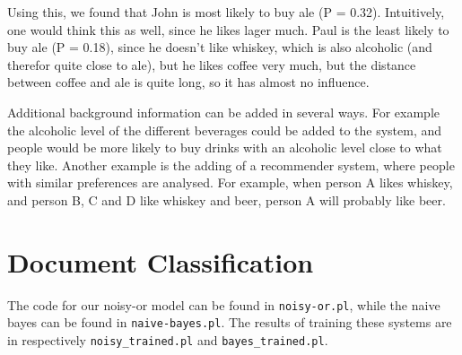 \documentclass{article}
\begin{document}
Using this, we found that John is most likely to buy ale (P = 0.32). Intuitively, one would think this as well, since he likes lager much. Paul is the least likely to buy ale (P = 0.18), since he doesn't like whiskey, which is also alcoholic (and therefor quite close to ale), but he likes coffee very much, but the distance between coffee and ale is quite long, so it has almost no influence. 

Additional background information can be added in several ways. For example the alcoholic level of the different beverages could be added to the system, and people would be more likely to buy drinks with an alcoholic level close to what they like. Another example is the adding of a recommender system, where people with similar preferences are analysed. For example, when person A likes whiskey, and person B, C and D like whiskey and beer, person A will probably like beer.

\section{Document Classification}
The code for our noisy-or model can be found in \texttt{noisy-or.pl}, while the naive bayes can be found in \texttt{naive-bayes.pl}. The results of training these systems are in respectively \texttt{noisy\_trained.pl} and \texttt{bayes\_trained.pl}.
\end{document}
